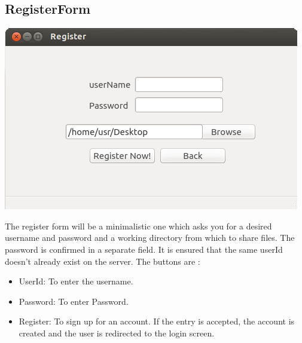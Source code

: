 \documentclass[]{article}
\begin{document}
\subsection{RegisterForm}
\begin{center}
\includegraphics[scale=0.4]{images/img_register.png}
\end{center}

The register form will be a minimalistic one which asks you for a desired username and password and a working directory from which to share files. The password is confirmed in a separate field. It is ensured that the same userId doesn't already exist on the server. 
The buttons are :
\begin{itemize}
\item UserId: To enter the username.
\item Password: To enter Password.
\item Register: To sign up for an account. If the entry is accepted, the account is created and the user is redirected to the login screen.  
\end{itemize}
\end{document}
